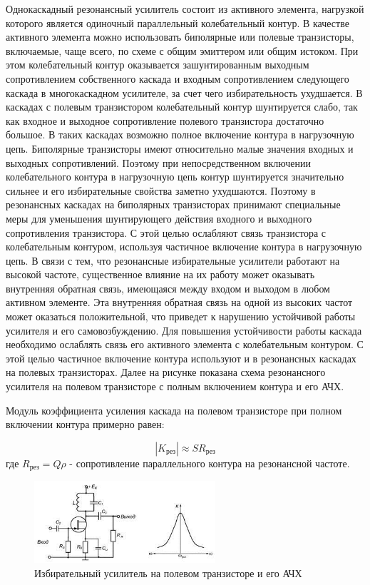 \documentclass[unicode, 12pt, a4paper, oneside]{article}
\begin{document}
Однокаскадный резонансный усилитель состоит из активного элемента, нагрузкой которого является одиночный параллельный колебательный контур. В качестве активного элемента можно использовать биполярные или полевые транзисторы, включаемые, чаще всего, по схеме с общим эмиттером или общим истоком. При этом колебательный контур оказывается зашунтированным выходным сопротивлением собственного каскада и входным сопротивлением следующего каскада в многокаскадном усилителе, за счет чего избирательность ухудшается. В каскадах с полевым транзистором колебательный контур шунтируется слабо, так как входное и выходное сопротивление полевого транзистора достаточно большое. В таких каскадах возможно полное включение контура в нагрузочную цепь. Биполярные транзисторы имеют относительно малые значения входных и выходных сопротивлений. Поэтому при непосредственном включении колебательного контура в нагрузочную цепь контур шунтируется значительно сильнее и его избирательные свойства заметно ухудшаются. Поэтому в резонансных каскадах на биполярных транзисторах принимают специальные меры для уменьшения шунтирующего действия входного и выходного сопротивления транзистора. С этой целью ослабляют связь транзистора с колебательным контуром, используя частичное включение контура в нагрузочную цепь. В связи с тем, что резонансные избирательные усилители работают на высокой частоте, существенное влияние на их работу может оказывать внутренняя обратная связь, имеющаяся между входом и выходом в любом активном элементе. Эта внутренняя обратная связь на одной из высоких частот может оказаться положительной, что приведет к нарушению устойчивой работы усилителя и его самовозбуждению. Для повышения устойчивости работы каскада необходимо ослаблять связь его активного элемента с колебательным контуром. С этой целью частичное включение контура используют и в резонансных каскадах на полевых транзисторах. Далее на рисунке показана схема резонансного усилителя на полевом транзисторе с полным включением контура и его АЧХ.

Модуль коэффициента усиления каскада на полевом транзисторе при полном включении контура примерно равен:

\begin{equation}
|K_\text{рез}| \approx S R_\text{рез}
\end{equation}
где $ R_\text{рез} = Q\rho $ - сопротивление параллельного контура на резонансной частоте.

\begin{figure}[H]
\centering
\includegraphics[width=0.6\textwidth]{7_field_based_amp.jpg}
\caption{Избирательный усилитель на полевом транзисторе и его АЧХ}
\label{fig:7_field_based_amp}
\end{figure}
\end{document}
